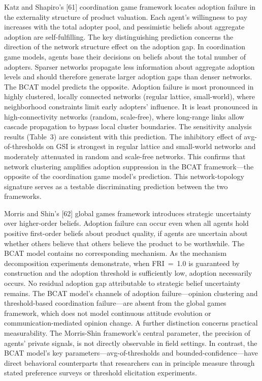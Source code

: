 \documentclass[10pt,letterpaper]{article}
\begin{document}
Katz and Shapiro's [61] coordination game framework locates adoption failure in the externality structure of product valuation. Each agent's willingness to pay increases with the total adopter pool, and pessimistic beliefs about aggregate adoption are self-fulfilling. The key distinguishing prediction concerns the direction of the network structure effect on the adoption gap. In coordination game models, agents base their decisions on beliefs about the total number of adopters. Sparser networks propagate less information about aggregate adoption levels and should therefore generate larger adoption gaps than denser networks. The BCAT model predicts the opposite. Adoption failure is most pronounced in highly clustered, locally connected networks (regular lattice, small-world), where neighborhood constraints limit early adopters' influence. It is least pronounced in high-connectivity networks (random, scale-free), where long-range links allow cascade propagation to bypass local cluster boundaries. The sensitivity analysis results (Table~3) are consistent with this prediction. The inhibitory effect of avg-of-thresholds on GSI is strongest in regular lattice and small-world networks and moderately attenuated in random and scale-free networks. This confirms that network clustering amplifies adoption suppression in the BCAT framework---the opposite of the coordination game model's prediction. This network-topology signature serves as a testable discriminating prediction between the two frameworks.

Morris and Shin's [62] global games framework introduces strategic uncertainty over higher-order beliefs. Adoption failure can occur even when all agents hold positive first-order beliefs about product quality, if agents are uncertain about whether others believe that others believe the product to be worthwhile. The BCAT model contains no corresponding mechanism. As the mechanism decomposition experiments demonstrate, when FRI~=~1.0 is guaranteed by construction and the adoption threshold is sufficiently low, adoption necessarily occurs. No residual adoption gap attributable to strategic belief uncertainty remains. The BCAT model's channels of adoption failure---opinion clustering and threshold-based coordination failure---are absent from the global games framework, which does not model continuous attitude evolution or communication-mediated opinion change. A further distinction concerns practical measurability. The Morris-Shin framework's central parameter, the precision of agents' private signals, is not directly observable in field settings. In contrast, the BCAT model's key parameters---avg-of-thresholds and bounded-confidence---have direct behavioral counterparts that researchers can in principle measure through stated preference surveys or threshold elicitation experiments.
\end{document}
